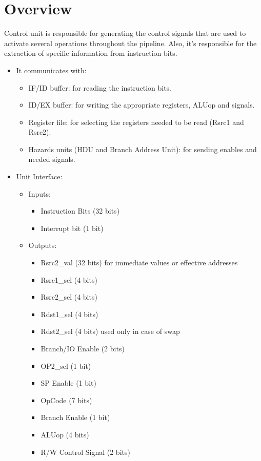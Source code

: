 
\section{Overview}
Control unit is responsible for generating the control signals that are used to activate several operations throughout the pipeline. Also, it's responsible for the extraction of specific information from instruction bits.

\begin{itemize}
    \item It communicates with:
    \begin{itemize}
        \item IF/ID buffer: for reading the instruction bits.
        \item ID/EX buffer: for writing the appropriate registers, ALUop and signals.
        \item Register file: for selecting the registers needed to be read (Rsrc1 and Rsrc2).
        \item Hazards units (HDU and Branch Address Unit): for sending enables and needed signals.
    \end{itemize}
    
    \item Unit Interface:
    \begin{itemize}
    
        \item Inputs: 
        \begin{itemize}
            \item Instruction Bits (32 bits)
            \item Interrupt bit (1 bit)
        \end{itemize}
        
        \item Outputs:
        \begin{itemize}
            \item Rsrc2\_val (32 bits) for immediate values or effective addresses
            \item Rsrc1\_sel (4 bits)
            \item Rsrc2\_sel (4 bits)
            \item Rdst1\_sel (4 bits)
            \item Rdst2\_sel (4 bits) used only in case of swap
            \item Branch/IO Enable (2 bits)
            \item OP2\_sel (1 bit)
            \item SP Enable (1 bit)
            \item OpCode (7 bits)
            \item Branch Enable (1 bit)
            \item ALUop (4 bits)
            \item R/W Control Signal (2 bits)
        \end{itemize}
        

\end{itemize}
\end{itemize}
